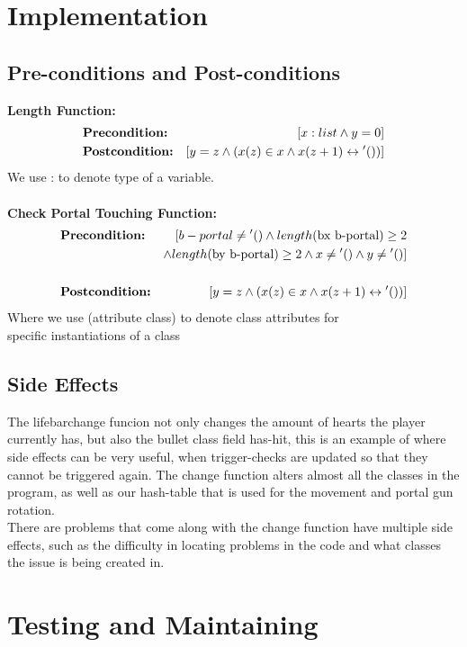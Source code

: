 \documentclass{article}
\begin{document}
	\section{Implementation}
	\subsection{Pre-conditions and Post-conditions}
	\textbf{Length Function:}
	\begin{align*}
	&\text{\textbf{Precondition:}} &[x : list \land y = 0] \\
	&\text{\textbf{Postcondition:}} &[y = z \land (x(z) \in x \land x(z + 1) \leftrightarrow \medskip'())] \\
	\end{align*}
	We use : to denote type of a variable. \\ \\
	\textbf{Check Portal Touching Function:} \\
	\begin{align*}
	&\text{\textbf{Precondition:}} &[b-portal \neq \medskip '() \land length(\text{bx b-portal}) \geq 2 \\
	&&\land \medskip length(\text{by b-portal}) \geq 2 \land x \neq \medskip '() \land y \neq \medskip '()] \\ \\
	&\text{\textbf{Postcondition:}} &[y = z \land (x(z) \in x \land x(z + 1) \leftrightarrow \medskip'())]
	\end{align*}
	Where we use (attribute class) to denote class attributes for \\
	specific instantiations of a class
	\subsection{Side Effects}
	The lifebarchange funcion not only changes the amount of hearts the player currently has, but also the bullet class field has-hit, this is an example of where side effects can be very useful, when trigger-checks are updated so that they cannot be triggered again.
	\medskip
	The change function alters almost all the classes in the program, as well as our hash-table that is used for the movement and portal gun rotation. \\
	There are problems that come along with the change function have multiple side effects, such as the difficulty in locating problems in the code and what classes the issue is being created in. \\
	\section{Testing and Maintaining}
	
\end{document}
